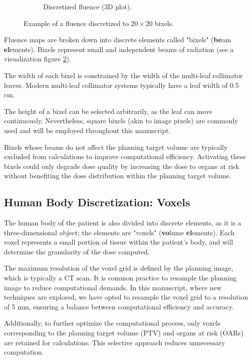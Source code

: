 \begin{figure}
\begin{subfigure}[c]{0.45\textwidth}
		\caption{Discretized fluence (3D plot).}
		\label{fig:fluence_bixel_3D_discrete}
	\end{subfigure}
	\caption{Example of a fluence discretized to $20 \times 20$ bixels.}
	\label{fig:fluence_bixel}
\end{figure}

Fluence maps are broken down into discrete elements called "bixels" (\textbf{be}am \textbf{el}ements).
Bixels represent small and independent beams of radiation (see a visualization figure \ref{fig:fluence_bixel}).

The width of each bixel is constrained by the width of the multi-leaf collimator leaves.
Modern multi-leaf collimator systems typically have a leaf width of 0.5 cm.

The height of a bixel can be selected arbitrarily, as the leaf can move continuously.
Nevertheless, square bixels (akin to image pixels) are commonly used and will be employed throughout this manuscript.

Bixels whose beams do not affect the planning target volume are typically excluded from calculations to improve computational efficiency.
Activating these bixels could only degrade dose quality by increasing the dose to organs at risk without benefiting the dose distribution within the planning target volume.

\subsection[Voxels]{Human Body Discretization: Voxels}
The human body of the patient is also divided into discrete elements, as it is a three-dimensional object; the elements are "voxels" (\textbf{vo}lume \textbf{el}ements).
Each voxel represents a small portion of tissue within the patient's body, and will determine the granularity of the dose computed.

The maximum resolution of the voxel grid is defined by the planning image, which is typically a CT scan.
It is common practice to resample the planning image to reduce computational demands.
In this manuscript, where new techniques are explored, we have opted to resample the voxel grid to a resolution of 5 mm, ensuring a balance between computational efficiency and accuracy.

Additionally, to further optimize the computational process, only voxels corresponding to the planning target volume (PTV) and organs at risk (OARs) are retained for calculations.
This selective approach reduces unnecessary computation.

